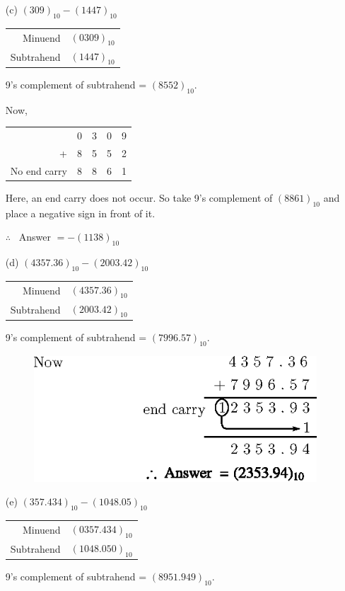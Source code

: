 \begin{solution}
\begin{itemize}
\item[(c)] $(309)_{10}-(1447)_{10}$
\begin{center}
\begin{tabular}{r@{\;=\;}l}
Minuend & $(0309)_{10}$\\
Subtrahend & $(1447)_{10}$
\end{tabular}
\end{center}
9's complement of subtrahend = $(8552)_{10}$.

Now,
\begin{center}
\tabcolsep=4pt
\begin{tabular}{rcccc}
 & 0 & 3 & 0 & 9\\
+ & 8 & 5 & 5 & 2\\
\cline{2-5}
No end carry & 8 & 8 & 6 & 1
\end{tabular}
\end{center}
Here, an end carry does not occur. So take 9's complement of $(8861)_{10}$ and place a negative sign in front of it.

$\therefore$~ Answer $=-(1138)_{10}$

\item[(d)] $(4357.36)_{10}-(2003.42)_{10}$
\begin{center}
\begin{tabular}{r@{\;=\;}l}
Minuend & $(4357.36)_{10}$\\
Subtrahend & $(2003.42)_{10}$
\end{tabular}
\end{center}
9's complement of subtrahend = $(7996.57)_{10}$.
\begin{figure}[H]
\centering
\includegraphics{chap5/div55.eps}
\end{figure}

\item[(e)] $(357.434)_{10}-(1048.05)_{10}$
\begin{center}
\begin{tabular}{r@{\;=\;}l}
Minuend & $(0357.434)_{10}$\\
Subtrahend & $(1048.050)_{10}$
\end{tabular}
\end{center}
9's complement of subtrahend = $(8951.949)_{10}$.


\end{itemize}
\end{solution}

